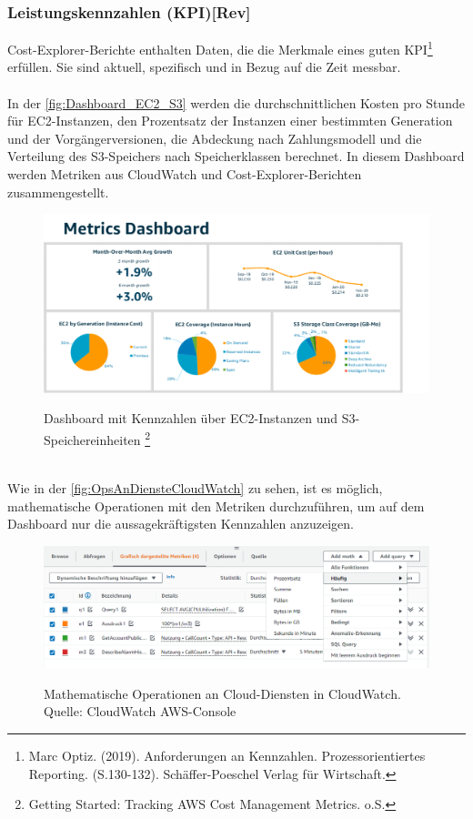 \subsubsection*{Leistungskennzahlen (KPI)[Rev]}
Cost-Explorer-Berichte enthalten Daten, die die Merkmale eines guten KPI\footnote{Marc Optiz. (2019). Anforderungen an Kennzahlen. Prozessorientiertes Reporting. (S.130-132). Schäffer-Poeschel Verlag für Wirtschaft.\cite{PR1}} erfüllen. Sie sind aktuell, spezifisch und in Bezug auf die Zeit messbar.
\\\\
In der \autoref{fig:Dashboard_EC2_S3} werden %
die durchschnittlichen Kosten pro Stunde für EC2-Instanzen, den Prozentsatz der Instanzen einer bestimmten Generation und der Vorgängerversionen, die Abdeckung nach Zahlungsmodell und die Verteilung des S3-Speichers nach Speicherklassen berechnet. In diesem Dashboard werden Metriken aus CloudWatch und Cost-Explorer-Berichten zusammengestellt.
\begin{figure}[h!]
  \centering
  \includegraphics[scale=0.65]{sources/Dashboard_EC2_S3}
  \caption[Dashboard mit EC2 und S3 Metriken]{}
  \label{fig:Dashboard_EC2_S3} 
  Dashboard mit Kennzahlen über EC2-Instanzen und S3-Speichereinheiten \footnote{Getting Started: Tracking AWS Cost Management Metrics. o.S.\cite{AMZ35}}
\end{figure}\\
Wie in der \autoref{fig:OpsAnDiensteCloudWatch} zu sehen, ist es möglich, mathematische Operationen mit den Metriken durchzuführen, um auf dem Dashboard nur die aussagekräftigsten Kennzahlen anzuzeigen.
\begin{figure}[h!]
  \centering
  \includegraphics[scale=0.55]{sources/OpsAnDiensteCloudWatch}
  \caption[Operationen an Cloud-Diensten in CloudWatch]{}
  \label{fig:OpsAnDiensteCloudWatch} 
  Mathematische Operationen an Cloud-Diensten in CloudWatch.\\
  Quelle: CloudWatch AWS-Console
\end{figure}
